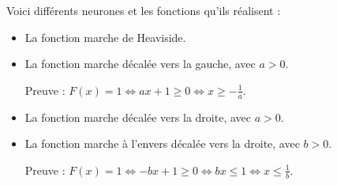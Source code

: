 \documentclass[11pt,class=report,crop=false]{standalone}
\begin{document}
Voici différents neurones et les fonctions qu'ils réalisent :
\begin{itemize}
  \item La fonction marche de Heaviside.
  
\begin{center}
\begin{minipage}{0.35\textwidth}
\end{minipage}
\begin{minipage}{0.59\textwidth}
\end{minipage}
\end{center}  

  
\item La fonction marche décalée vers la gauche, avec $a>0$.
  
Preuve : $F(x) = 1 \iff ax+1\ge0 \iff x \ge -\frac1a$.
  
\begin{center}
\begin{minipage}{0.35\textwidth}
\end{minipage}
\begin{minipage}{0.59\textwidth}
\end{minipage}
\end{center}    
    
  \item La fonction marche décalée vers la droite, avec $a>0$.  
  
\begin{center}
\begin{minipage}{0.35\textwidth}
\end{minipage}
\begin{minipage}{0.59\textwidth}
\end{minipage}
\end{center}    

  
\item La fonction marche à l'envers décalée vers la droite, avec $b>0$.
  
  Preuve : $F(x) = 1 \iff -bx+1\ge0 \iff bx \le 1 \iff x \le \frac1b$.
  
\begin{center}
\begin{minipage}{0.35\textwidth}
\end{minipage}
\begin{minipage}{0.59\textwidth}
\end{minipage}
\end{center}  
  


\end{itemize}
\end{document}
